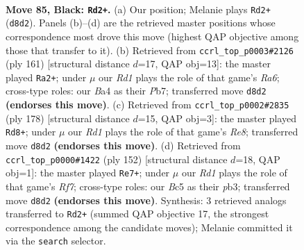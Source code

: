 \documentclass[11pt]{article}
\begin{document}
\clearpage

\begin{figure}[p]\centering
\begin{subfigure}{0.46\textwidth}\centering
\resizebox{\linewidth}{!}{%
\newchessgame
\chessboard[
  setfen={3r4/P5k1/R7/2b2p2/b4P2/8/7K/8 b - - 6 85},
  showmover=false,
  pgfstyle=straightmove, color=movearrow, markmove={d8-d2}
]}
\caption{}
\end{subfigure}\hfill
\begin{subfigure}{0.46\textwidth}\centering
\resizebox{\linewidth}{!}{%
\newchessgame
\chessboard[
  setfen={8/1pR4P/6k1/6p1/6P1/r7/6K1/8 b - - 0 81},
  showmover=false,
  pgfstyle=straightmove, color=movearrow, markmove={a3-a2}
]}
\caption{}
\end{subfigure}
\\[4pt]
\begin{subfigure}{0.46\textwidth}\centering
\resizebox{\linewidth}{!}{%
\newchessgame
\chessboard[
  setfen={4R3/8/8/ppr5/3k4/P2B4/1K6/8 w - - 13 90},
  showmover=false,
  pgfstyle=straightmove, color=movearrow, markmove={e8-d8}
]}
\caption{}
\end{subfigure}\hfill
\begin{subfigure}{0.46\textwidth}\centering
\resizebox{\linewidth}{!}{%
\newchessgame
\chessboard[
  setfen={8/5R2/8/3P4/8/1p6/1K2k1p1/6r1 w - - 19 77},
  showmover=false,
  pgfstyle=straightmove, color=movearrow, markmove={f7-e7}
]}
\caption{}
\end{subfigure}
\caption{\textbf{Move 85, Black: \texttt{Rd2+}.} (a) Our position; Melanie plays \texttt{Rd2+} (\texttt{d8d2}). Panels (b)--(d) are the retrieved master positions whose correspondence most drove this move (highest QAP objective among those that transfer to it). (b) Retrieved from \texttt{ccrl\_top\_p0003\#2126} (ply 161) [structural distance $d$=17, QAP obj=13]: the master played \texttt{Ra2+}; under $\mu$ our \emph{Rd1} plays the role of that game's \emph{Ra6}; cross-type roles: our \emph{B}a4 as their \emph{P}b7; transferred move \texttt{d8d2} \textbf{(endorses this move)}. (c) Retrieved from \texttt{ccrl\_top\_p0002\#2835} (ply 178) [structural distance $d$=15, QAP obj=3]: the master played \texttt{Rd8+}; under $\mu$ our \emph{Rd1} plays the role of that game's \emph{Re8}; transferred move \texttt{d8d2} \textbf{(endorses this move)}. (d) Retrieved from \texttt{ccrl\_top\_p0000\#1422} (ply 152) [structural distance $d$=18, QAP obj=1]: the master played \texttt{Re7+}; under $\mu$ our \emph{Rd1} plays the role of that game's \emph{Rf7}; cross-type roles: our \emph{B}c5 as their \emph{p}b3; transferred move \texttt{d8d2} \textbf{(endorses this move)}. Synthesis: 3 retrieved analogs transferred to \texttt{Rd2+} (summed QAP objective 17, the strongest correspondence among the candidate moves); Melanie committed it via the \texttt{search} selector.}
\label{fig:thought-m169}
\end{figure}
\end{document}
